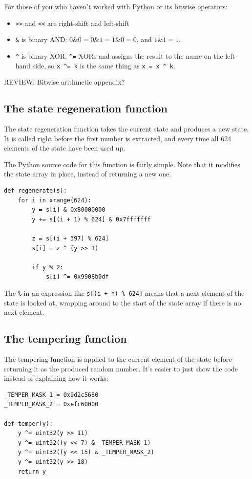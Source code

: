 \documentclass[11pt,ebook,table,dvipsnames]{memoir}
\begin{document}
For those of you who haven't worked with Python or its bitwise
operators:

\begin{itemize}
\item \verb~>>~ and \verb~<<~ are right-shift and left-shift
\item \verb~&~ is binary AND: $0 \& 0 = 0 \& 1 = 1 \& 0 = 0$, and $1 \& 1 =
   1$.
\item \verb~^~ is binary XOR, \verb~^=~ XORs and assigns the result to
the name on the left-hand side, so \verb~x ^= k~ is the same
thing as \verb~x = x ^ k~.
\end{itemize}

REVIEW: Bitwise arithmetic appendix?
\subsection{The state regeneration function}
\label{sec-2-10-6-3}

The state regeneration function takes the current state and produces a
new state. It is called right before the first number is extracted,
and every time all 624 elements of the state have been used up.

The Python source code for this function is fairly simple. Note that
it modifies the state array in place, instead of returning a new one.

\begin{verbatim}
def regenerate(s):
    for i in xrange(624):
        y = s[i] & 0x80000000
        y += s[(i + 1) % 624] & 0x7fffffff

        z = s[(i + 397) % 624]
        s[i] = z ^ (y >> 1)

        if y % 2:
            s[i] ^= 0x9908b0df
\end{verbatim}

The \verb~%~ in an expression like \verb~s[(i + n) % 624]~ means that a next
element of the state is looked at, wrapping around to the start of the
state array if there is no next element.
\subsection{The tempering function}
\label{sec-2-10-6-4}

The tempering function is applied to the current element of the state
before returning it as the produced random number. It's easier to just
show the code instead of explaining how it works:

\begin{verbatim}
_TEMPER_MASK_1 = 0x9d2c5680
_TEMPER_MASK_2 = 0xefc60000

def temper(y):
    y ^= uint32(y >> 11)
    y ^= uint32((y << 7) & _TEMPER_MASK_1)
    y ^= uint32((y << 15) & _TEMPER_MASK_2)
    y ^= uint32(y >> 18)
    return y
\end{verbatim}
\end{document}
